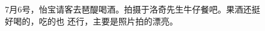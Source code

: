 \documentclass[cn,11pt,chinese]{elegantbook}
\begin{document}
\begin{figure}
    \caption{7月6号，怡宝请客去琶醍喝酒。拍摄于洛奇先生牛仔餐吧。果酒还挺好喝的，吃的也
    还行，主要是照片拍的漂亮。}
\end{figure}
\end{document}

